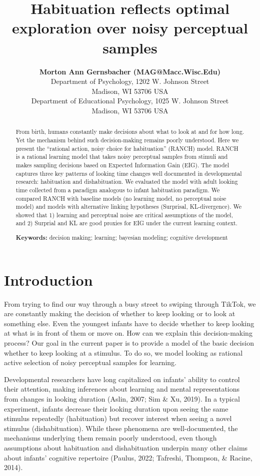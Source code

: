 \documentclass[10pt, letterpaper]{article}
\title{Habituation reflects optimal exploration over noisy perceptual
samples}
\author{{\large \bf Morton Ann Gernsbacher (MAG@Macc.Wisc.Edu)} \\ Department of Psychology, 1202 W. Johnson Street \\ Madison, WI 53706 USA \AND {\large \bf Sharon J.~Derry (SDJ@Macc.Wisc.Edu)} \\ Department of Educational Psychology, 1025 W. Johnson Street \\ Madison, WI 53706 USA}
\begin{document}
\maketitle

\begin{abstract}
From birth, humans constantly make decisions about what to look at and
for how long. Yet the mechanism behind such decision-making remains
poorly understood. Here we present the ``rational action, noisy choice
for habituation'' (RANCH) model. RANCH is a rational learning model that
takes noisy perceptual samples from stimuli and makes sampling decisions
based on Expected Information Gain (EIG). The model captures three key
patterns of looking time changes well documented in developmental
research: habituation and dishabituation. We evaluated the model with
adult looking time collected from a paradigm analogous to infant
habituation paradigm. We compared RANCH with baseline models (no
learning model, no perceptual noise model) and models with alternative
linking hypotheses (Surprisal, KL-divergence). We showed that 1)
learning and perceptual noise are critical assumptions of the model, and
2) Surprial and KL are good proxies for EIG under the current learning
context.

\textbf{Keywords:}
decision making; learning; bayesian modeling; cognitive development
\end{abstract}

\hypertarget{introduction}{%
\section{Introduction}\label{introduction}}

From trying to find our way through a busy street to swiping through
TikTok, we are constantly making the decision of whether to keep looking
or to look at something else. Even the youngest infants have to decide
whether to keep looking at what is in front of them or move on. How can
we explain this decision-making process? Our goal in the current paper
is to provide a model of the basic decision whether to keep looking at a
stimulus. To do so, we model looking as rational active selection of
noisy perceptual samples for learning.

Developmental researchers have long capitalized on infants' ability to
control their attention, making inferences about learning and mental
representations from changes in looking duration (Aslin, 2007; Sim \&
Xu, 2019). In a typical experiment, infants decrease their looking
duration upon seeing the same stimulus repeatedly (habituation) but
recover interest when seeing a novel stimulus (dishabituation). While
these phenomena are well-documented, the mechanisms underlying them
remain poorly understood, even though assumptions about habituation and
dishabituation underpin many other claims about infants' cognitive
repertoire (Paulus, 2022; Tafreshi, Thompson, \& Racine, 2014).
\end{document}
